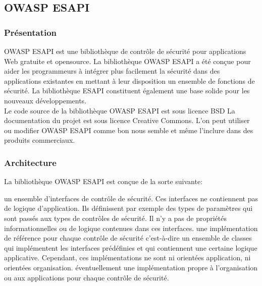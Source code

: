 \subsection{OWASP ESAPI}
\subsubsection{Présentation}
OWASP ESAPI est une bibliothèque de contrôle de sécurité pour applications Web gratuite et opensource. La bibliothèque OWASP ESAPI a été conçue pour aider les programmeurs à intégrer plus facilement la sécurité dans des applications existantes  en mettant à leur disposition un ensemble de fonctions de sécurité. La bibliothèque ESAPI constituent également une base solide pour les nouveaux développements.\\
Le code source de la bibliothèque OWASP ESAPI est sous licence BSD La documentation du projet est sous licence Creative Commons. L'on peut utiliser ou modifier OWASP ESAPI comme bon nous semble et même l'inclure dans des produits commerciaux.
\subsubsection{Architecture}
La bibliothèque OWASP ESAPI est conçue de la sorte suivante:
\begin{itemize}
	\itemcheck un ensemble d'interfaces de contrôle de sécurité. Ces interfaces ne contiennent pas de logique d'application. Ils définissent par exemple des types de paramètres qui sont passés aux types de contrôles de sécurité. Il n'y a pas de propriétés informationnelles ou de logique contenues dans ces interfaces.
	\itemcheck une implémentation de référence pour chaque contrôle de sécurité c'est-à-dire un ensemble de classes qui implémentent les interfaces prédéfinies et qui contiennent une certaine logique applicative. Cependant, ces implémentations ne sont ni orientées application, ni orientées organisation.
	\itemcheck éventuellement une implémentation propre à l'organisation ou aux applications pour chaque contrôle de sécurité.
\end{itemize}
